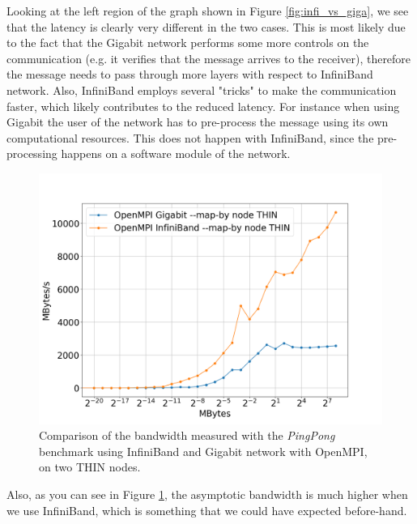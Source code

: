 \documentclass{article}
\begin{document}
Looking at the left region of the graph shown in Figure \ref{fig:infi_vs_giga}, we see that the latency is clearly very different in the two cases. This is most likely due to the fact that the Gigabit network performs some more controls on the communication (e.g. it verifies that the message arrives to the receiver), therefore the message needs to pass through more layers with respect to InfiniBand network. Also, InfiniBand employs several "tricks" to make the communication faster, which likely contributes to the reduced latency. For instance when using Gigabit the user of the network has to pre-process the message using its own computational resources. This does not happen with InfiniBand, since the pre-processing happens on a software module of the network.

\begin{figure}[t]
    \centering
    \includegraphics[width=\textwidth]{benchmark/infi_vs_giga_node_bandw.png}
    \caption{Comparison of the bandwidth measured with the \emph{PingPong} benchmark using InfiniBand and Gigabit network with OpenMPI, on two THIN nodes.}
    \label{fig:infi_vs_giga_bandwidth}
\end{figure}

Also, as you can see in Figure \ref{fig:infi_vs_giga_bandwidth}, the asymptotic bandwidth is much higher when we use InfiniBand, which is something that we could have expected before-hand.
\end{document}
